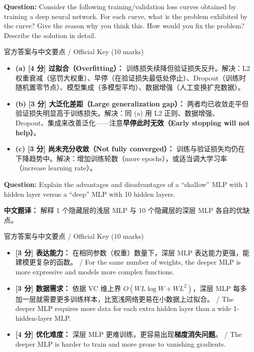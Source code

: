\textbf{Question:} Consider the following training/validation loss curves obtained by training a deep neural network. For each curve, what is the problem exhibited by the curve? Give the reason why you think this. How would you fix the problem? Describe the solution in detail.


\begin{StudySolution}{官方答案与中文要点 / Official Key (10 marks)}
\begin{itemize}
\item \textbf{(a) [4 分] 过拟合（Overfitting）：} 训练损失续降但验证损失反升。解决：L2 权重衰减（惩罚大权重）、早停（在验证损失最低处停止）、Dropout（训练时随机置零节点）、模型集成（多模型平均）、数据增强（人工变换扩充数据）。
\item \textbf{(b) [3 分] 大泛化差距（Large generalization gap）：} 两者均已收敛走平但验证损失明显高于训练损失。解决：同 (a) 用 L2 正则、数据增强、Dropout、集成来改善泛化——注意\textbf{早停此时无效（Early stopping will not help）}。
\item \textbf{(c) [3 分] 尚未充分收敛（Not fully converged）：} 训练与验证损失均仍在下降趋势中。解决：增加训练轮数（more epochs），或适当调大学习率（increase learning rate）。
\end{itemize}
\end{StudySolution}

\textbf{Question:} Explain the advantages and disadvantages of a ``shallow'' MLP with 1 hidden layer versus a ``deep'' MLP with 10 hidden layers.

\textbf{中文题译：} 解释 1 个隐藏层的浅层 MLP 与 10 个隐藏层的深层 MLP 各自的优缺点。

\begin{StudySolution}{官方答案与中文要点 / Official Key (10 marks)}
\begin{itemize}
\item \textbf{[3 分] 表达能力：} 在相同参数（权重）数量下，深层 MLP 表达能力更强，能建模更复杂的函数。 / For the same number of weights, the deeper MLP is more expressive and models more complex functions.
\item \textbf{[3 分] 数据需求：} 依据 VC 维上界 $O(WL\log W + WL^2)$，深层 MLP 每多加一层就需要更多训练样本，比宽浅网络更易在小数据上过拟合。 / The deeper MLP requires more data for each extra hidden layer than a wide 1-hidden-layer MLP.
\item \textbf{[4 分] 优化难度：} 深层 MLP 更难训练，更容易出现\textbf{梯度消失问题}。 / The deeper MLP is harder to train and more prone to vanishing gradients.
\end{itemize}
\end{StudySolution}

